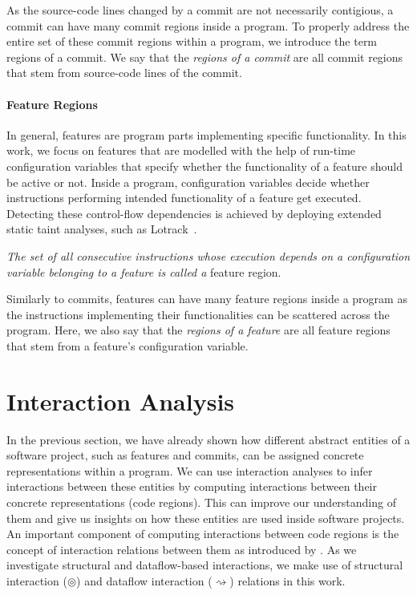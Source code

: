 As the source-code lines changed by a commit are not necessarily contigious,
a commit can have many commit regions inside a program. 
To properly address the entire set of these commit regions within a program, we introduce the term regions of a commit.
We say that the \emph{regions of a commit} are all commit regions that stem from source-code lines of the commit. 

\paragraph{Feature Regions}\label{sec:feature_regions}

In general, features are program parts implementing specific functionality.
In this work, we focus on features that are modelled with the help of run-time configuration variables that specify whether the functionality of a feature should be active or not.
Inside a program, configuration variables decide whether instructions performing intended functionality of a feature get executed. 
Detecting these control-flow dependencies is achieved by deploying extended static taint analyses, such as Lotrack~\cite{lillack2014tracking}.

\begin{definition}\label{def:feature_regions}
	\emph{The set of all consecutive instructions whose execution depends on a configuration variable belonging to a feature is called a} feature region. 
\end{definition}

Similarly to commits, features can have many feature regions inside a program
as the instructions implementing their functionalities can be scattered across the program.
Here, we also say that the \emph{regions of a feature} are all feature regions that stem from a feature's configuration variable. 

\section{Interaction Analysis}\label{sec:interaction_analysis}

In the previous section, we have already shown how different abstract entities of a software project, such as features and commits, can be assigned concrete representations within a program.
We can use interaction analyses to infer interactions between these entities by computing interactions between their concrete representations (code regions).
This can improve our understanding of them and give us insights on how these entities are used inside software projects. 
An important component of computing interactions between code regions is the concept of interaction relations between them as introduced by \citet{sattler2023seal}.
As we investigate structural and dataflow-based interactions, we make use of structural interaction ($\circledcirc$) and dataflow interaction ($\rightsquigarrow$) relations in this work. 

